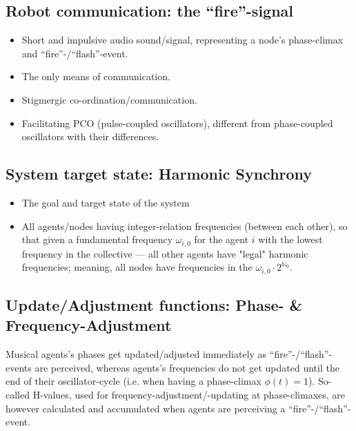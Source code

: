 	\subsection{Robot communication: the ``fire''-signal}
	\label{subsec:fire_signal}
		\begin{itemize}
			\item Short and impulsive audio sound/signal, representing a node's phase-climax and ``fire''-/``flash''-event.
			\item The only means of communication.
			\item Stigmergic co-ordination/communication.
			\item Facilitating PCO (pulse-coupled oscillators), different from phase-coupled oscillators with their differences.
		\end{itemize}

	

	\subsection{System target state: Harmonic Synchrony}
	\label{subsec:harmonic_synchrony}
		\begin{itemize}
			\item The goal and target state of the system
			\item All agents/nodes having integer-relation frequencies (between each other), so that given a fundamental frequency $\omega_{i,0}$ for the agent $i$ with the lowest frequency in the collective — all other agents have "legal" harmonic frequencies; meaning, all nodes have frequencies in the  $\omega_{i,0} \cdot 2^{\mathbb{N}_0}$.
			
		\end{itemize}
	
	
	\subsection{Update/Adjustment functions: Phase- \& Frequency-Adjustment}
	\label{subsec:update_functions}
	
	Musical agents's phases get updated/adjusted immediately as ``fire''-/``flash''-events are perceived, whereas agents's frequencies do not get updated until the end of their oscillator-cycle (i.e. when having a phase-climax $\phi(t)=1$). So-called H-values, used for frequency-adjustment/-updating at phase-climaxes, are however calculated and accumulated when agents are perceiving a ``fire''-/``flash''-event.
	
